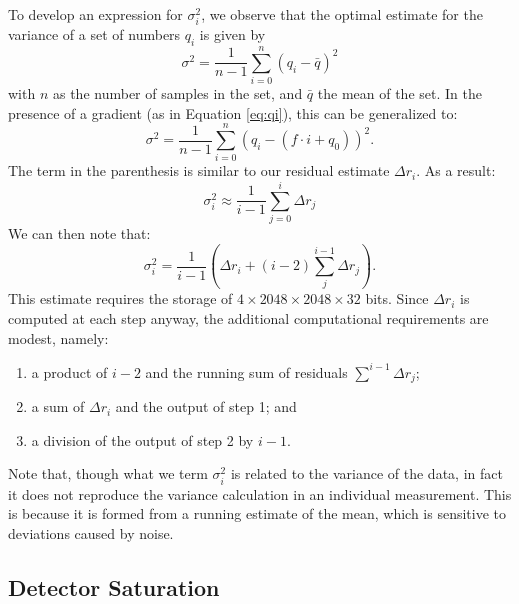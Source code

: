 \documentclass{ws-jai}
\begin{document}
To develop an expression for $\sigma_{i}^{2}$, we observe that the
optimal estimate for the variance of a set of numbers $q_{i}$ is given
by
%
\begin{equation}
\sigma^{2} = \frac{1}{n-1} \sum_{i=0}^{n} (q_{i} - \bar{q})^{2}
\end{equation}
%
with $n$ as the number of samples in the set, and $\bar{q}$ the mean
of the set.  In the presence of a gradient (as in Equation \ref{eq:qi}), this can be
generalized to:
%
\begin{equation}
 \sigma^{2} = \frac{1}{n-1} \sum_{i=0}^{n} (q_{i} - (f \cdot i + q_{0}))^{2}.
\end{equation}
%
The term in the parenthesis is similar to our residual
estimate $\Delta r_{i}$. As a result:
%
\begin{equation}
  \sigma^{2}_{i} \approx \frac{1}{i-1} \sum^{i}_{j=0}
  \Delta r_{j} 
\end{equation}
%
We can then note that:
%
\begin{equation}
  \sigma^{2}_{i} = \frac{1}{i-1} \left( \Delta r_{i} + (i-2)
  \sum_{j}^{i-1}\Delta r_{j} \right).
\end{equation}
%
This estimate requires the storage of $4 \times 2048 \times
2048 \times 32$ bits.  Since $\Delta r_{i}$ is computed at each step anyway,
the additional computational requirements are modest, namely:
%
\begin{enumerate}
\item a product of $i-2$ and the running sum of residuals $\sum^{i-1} \Delta
  r_{j}$;
\item a sum of $\Delta r_{i}$ and the output of step 1; and
\item a division of the output of step 2 by $i-1$.
\end{enumerate}

Note that, though what we term $\sigma_{i}^{2}$ is related to the
variance of the data, in fact it does not reproduce the variance
calculation in an individual measurement.  This is because it is
formed from a running estimate of the mean, which is sensitive to
deviations caused by noise.  


\subsection{Detector Saturation}
\end{document}
